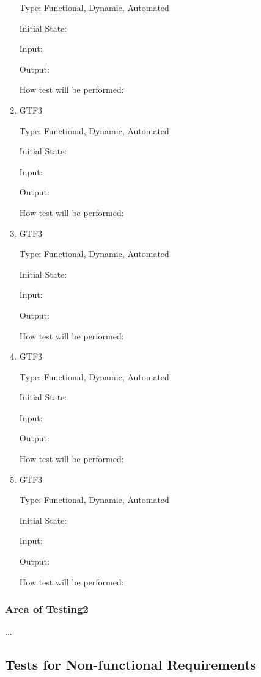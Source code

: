 \documentclass[12pt, titlepage]{article}
\begin{document}
\begin{enumerate}
Type: Functional, Dynamic, Automated
					
Initial State: 
					
Input: 
					
Output: 

How test will be performed: 

\item{GTF3\\}

Type: Functional, Dynamic, Automated
					
Initial State: 
					
Input: 
					
Output: 

How test will be performed: 

\item{GTF3\\}

Type: Functional, Dynamic, Automated
					
Initial State: 
					
Input: 
					
Output: 

How test will be performed: 

\item{GTF3\\}

Type: Functional, Dynamic, Automated
					
Initial State: 
					
Input: 
					
Output: 

How test will be performed: 

\item{GTF3\\}

Type: Functional, Dynamic, Automated
					
Initial State: 
					
Input: 
					
Output: 

How test will be performed: 


\end{enumerate}

\subsubsection{Area of Testing2}

...

\subsection{Tests for Non-functional Requirements}
\end{document}
